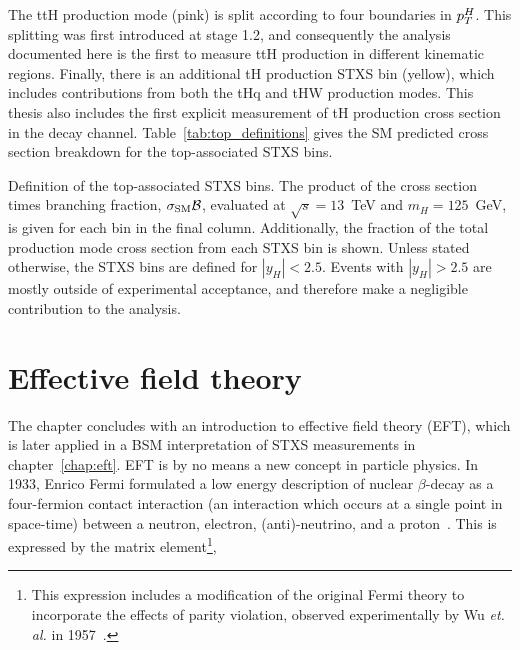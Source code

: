 The ttH production mode (pink) is split according to four boundaries in $p_T^H$. This splitting was first introduced at stage 1.2, and consequently the \Hgg analysis documented here is the first to measure ttH production in different kinematic regions. Finally, there is an additional tH production STXS bin (yellow), which includes contributions from both the tHq and tHW production modes. This thesis also includes the first explicit measurement of tH production cross section in the \Hgg decay channel. Table~\ref{tab:top_definitions} gives the SM predicted cross section breakdown for the top-associated STXS bins.


\begin{table}[htb!]
    \caption[Top-associated STXS bin definitions]{Definition of the top-associated STXS bins. The product of the cross section times \Hgg branching fraction, $\sigma_{\rm{SM}}\mathcal{B}$, evaluated at $\sqrt{s}=13$~TeV and $m_H=125$~GeV, is given for each bin in the final column. Additionally, the fraction of the total production mode cross section from each STXS bin is shown. Unless stated otherwise, the STXS bins are defined for $|y_H|<2.5$. Events with $|y_H|>2.5$ are mostly outside of experimental acceptance, and therefore make a negligible contribution to the \Hgg analysis.}
    \label{tab:top_definitions}
    \centering
    \scriptsize
    \renewcommand{\arraystretch}{1.5}
    \setlength{\tabcolsep}{5pt}
    
\end{table}

\FloatBarrier

\section{Effective field theory}\label{sec:theory_eft}
The chapter concludes with an introduction to effective field theory (EFT), which is later applied in a BSM interpretation of STXS measurements in chapter~\ref{chap:eft}. EFT is by no means a new concept in particle physics. In 1933, Enrico Fermi formulated a low energy description of nuclear $\beta$-decay as a four-fermion contact interaction (an interaction which occurs at a single point in space-time) between a neutron, electron, (anti)-neutrino, and a proton~\cite{Fermi:1933jpa}. This is expressed by the matrix element\footnote{This expression includes a modification of the original Fermi theory to incorporate the effects of parity violation, observed experimentally by Wu \textit{et. al.} in 1957~\cite{PhysRev.105.1413}.},

